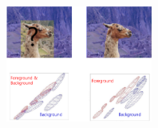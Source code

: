 \documentclass[notheorems,mathserif,table,compress]{beamer}  %
\begin{document}
\begin{frame}
\begin{columns}
      \begin{column}[c]{0.6\textwidth}
          \begin{figure}[!ht]
          \centering
          \includegraphics[width=1.9in]{GRAB2.png}
          \end{figure}
      \end{column}
   \end{columns}
\end{frame}
\end{document}
